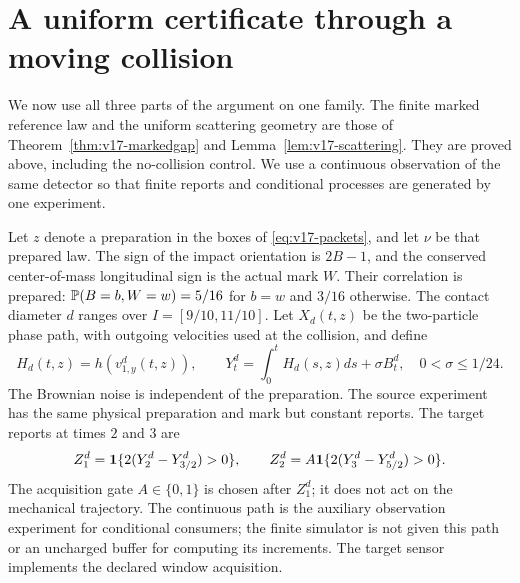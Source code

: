 \section{A uniform certificate through a moving collision}
\label{sec:v18-microscopic}
We now use all three parts of the argument on one family. The finite marked
reference law and the uniform scattering geometry are those of
Theorem~\ref{thm:v17-markedgap} and Lemma~\ref{lem:v17-scattering}.
They are proved above, including the no-collision control. We use a
continuous observation of the same detector so that finite reports and
conditional processes are generated by one experiment.

Let $z$ denote a preparation in the boxes of
\eqref{eq:v17-packets}, and let $\nu$ be that prepared law. The sign
of the impact orientation is $2B-1$, and the conserved center-of-mass
longitudinal sign is the actual mark $W$. Their correlation is prepared:
$\mathbb P(B=b,W=w)=5/16$ for $b=w$ and $3/16$ otherwise. The contact diameter
$d$ ranges over $I=[9/10,11/10]$. Let $X_d(t,z)$ be the two-particle phase
path, with outgoing velocities used at the collision, and define
\[
 H_d(t,z)=h(v_{1,y}^d(t,z)),\qquad
 Y_t^d=\int_0^tH_d(s,z)ds+\sigma B_t^d,
 \quad 0<\sigma\le1/24.
\]
The Brownian noise is independent of the preparation. The source experiment
has the same physical preparation and mark but constant reports. The target
reports at times $2$ and $3$ are
\begin{equation}\label{eq:v18-windowreports}
 Z_1^d=\mathbf 1\{2(Y_2^d-Y_{3/2}^d)>0\},\qquad
 Z_2^d=A\mathbf 1\{2(Y_3^d-Y_{5/2}^d)>0\}.
\end{equation}
The acquisition gate $A\in\{0,1\}$ is chosen after $Z_1^d$; it does not
act on the mechanical trajectory. The continuous path is the auxiliary
observation experiment for conditional consumers; the finite simulator is
not given this path or an uncharged buffer for computing its increments.
The target sensor implements the declared window acquisition.

